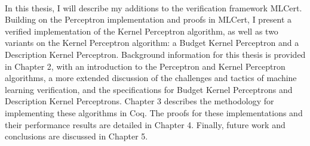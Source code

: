 \\In this thesis, I will describe my additions to the verification framework MLCert. Building on the Perceptron implementation and proofs in MLCert, I present a verified implementation of the Kernel Perceptron algorithm, as well as two variants on the Kernel Perceptron algorithm: a Budget Kernel Perceptron and a Description Kernel Perceptron. Background information for this thesis is provided in Chapter 2, with an introduction to the Perceptron and Kernel Perceptron algorithms, a more extended discussion of the challenges and tactics of machine learning verification, and the specifications for Budget Kernel Perceptrons and Description Kernel Perceptrons. Chapter 3 describes the methodology for implementing these algorithms in Coq. The proofs for these implementations and their performance results are detailed in Chapter 4. Finally, future work and conclusions are discussed in Chapter 5.

